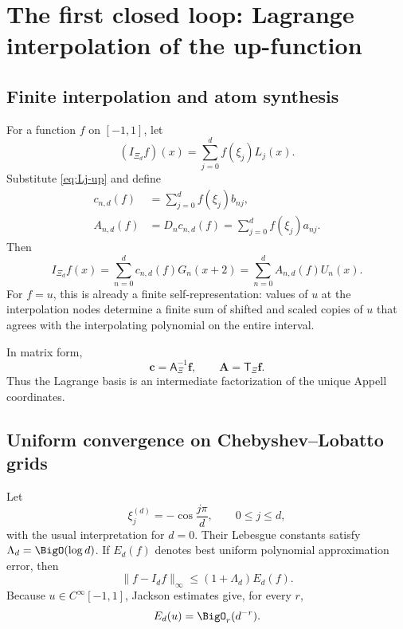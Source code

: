 \documentclass[11pt,oneside]{article}
\theoremstyle{definition}
\theoremstyle{remark}
\begin{document}
\section{The first closed loop: Lagrange interpolation of the up-function}

\subsection{Finite interpolation and atom synthesis}
For a function $f$ on $[-1,1]$, let
\begin{equation}
 (I_{\Xi_d}f)(x)=\sum_{j=0}^{d}f(\xi_j)L_j(x).
 \label{eq:interpolant}
\end{equation}
Substitute \eqref{eq:Lj-up} and define
\begin{align}
 c_{n,d}(f)&=\sum_{j=0}^{d}f(\xi_j)b_{nj},
 \label{eq:cndf}\\
 A_{n,d}(f)&=D_nc_{n,d}(f)
 =\sum_{j=0}^{d}f(\xi_j)a_{nj}.
 \label{eq:Andf}
\end{align}
Then
\begin{equation}
 I_{\Xi_d}f(x)
 =\sum_{n=0}^{d}c_{n,d}(f)G_n(x+2)
 =\sum_{n=0}^{d}A_{n,d}(f)U_n(x).
 \label{eq:finite-lagrange-loop-general}
\end{equation}
For $f=u$, this is already a finite self-representation: values of $u$ at
the interpolation nodes determine a finite sum of shifted and scaled copies
of $u$ that agrees with the interpolating polynomial on the entire interval.

In matrix form,
\begin{equation}
 \bm c=\mathsf A_\Xi^{-1}\bm f,
 \qquad
 \bm A=\mathsf T_\Xi\bm f.
 \label{eq:matrix-loop}
\end{equation}
Thus the Lagrange basis is an intermediate factorization of the unique
Appell coordinates.

\subsection{Uniform convergence on Chebyshev--Lobatto grids}
Let
\begin{equation}
 \xi_j^{(d)}=-\cos\frac{j\pi}{d},
 \qquad 0\le j\le d,
 \label{eq:cheb-lobatto}
\end{equation}
with the usual interpretation for $d=0$.  Their Lebesgue constants satisfy
$\Lambda_d=\BigO(\log d)$.  If $E_d(f)$ denotes best uniform polynomial
approximation error, then
\begin{equation}
 \|f-I_df\|_\infty\le(1+\Lambda_d)E_d(f).
 \label{eq:Lebesgue-inequality}
\end{equation}
Because $u\in C^\infty[-1,1]$, Jackson estimates give, for every $r$,
\begin{equation}
 E_d(u)=\BigO_r(d^{-r}).
 \label{eq:Jackson-up}
\end{equation}
\end{document}
